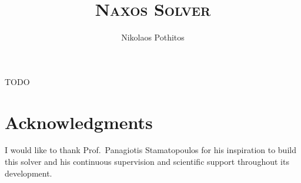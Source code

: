 \documentclass[a4paper]{article}
\begin{document}
\title{\textsc{Naxos Solver}}

\author{Nikolaos Pothitos}


\date{}

\maketitle

\noindent
TODO

\section*{Acknowledgments}

I would like to thank Prof.\ Panagiotis Stamatopoulos for
his inspiration to build this solver and his continuous
supervision and scientific support throughout its
development.


\end{document}
